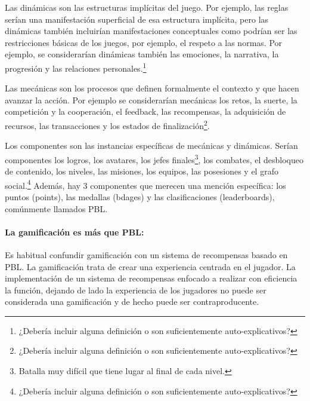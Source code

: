 %
Las dinámicas son las estructuras implícitas del juego. 
%
Por ejemplo, las reglas serían una manifestación superficial de esa estructura implícita, pero las dinámicas también incluirían manifestaciones conceptuales como podrían ser las restricciones básicas de los juegos, por ejemplo, el respeto a las normas.
%
Por ejemplo, se considerarían dinámicas también las emociones, la narrativa, la progresión y las relaciones personales.\footnote{¿Debería incluir alguna definición o son suficientemente auto-explicativos?}

 Las mecánicas son los procesos que definen formalmente el contexto y que hacen avanzar la acción. 
%
Por ejemplo se considerarían mecánicas los retos, la suerte, la competición y la cooperación, el feedback, las recompensas, la adquisición de recursos, las transacciones y los estados de finalización\footnote{¿Debería incluir alguna definición o son suficientemente auto-explicativos?}.

 Los componentes son las instancias específicas de mecánicas y dinámicas. 
%
Serían componentes los logros, los avatares, los jefes finales\footnote{Batalla muy difícil que tiene lugar al final de cada nivel.}, los combates, el desbloqueo de contenido, los niveles, las misiones, los equipos, las posesiones y el grafo social.\footnote{¿Debería incluir alguna definición o son suficientemente auto-explicativos?}
%
Además, hay 3 componentes que merecen una mención específica: los puntos (points), las medallas (bdages) y las clasificaciones (leaderboards), comúnmente llamados \gls{PBL}.


\paragraph{La gamificación es más que \gls{PBL}:} Es habitual confundir gamificación con un sistema de recompensas basado en \gls{PBL}. 
%
La gamificación trata de crear una experiencia centrada en el jugador. 
%
La implementación de un sistema de recompensas enfocado a realizar con eficiencia la función, dejando de lado la experiencia de los jugadores no puede ser considerada una gamificación y de hecho puede ser contraproducente.

